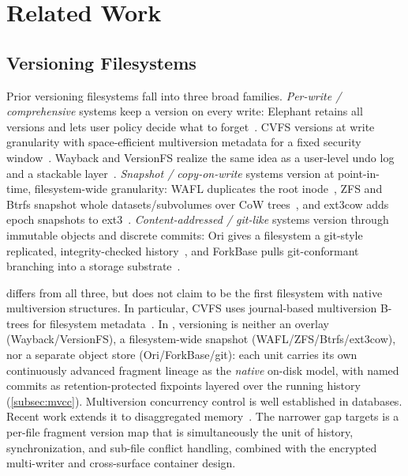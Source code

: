 \section{Related Work}
\label{sec:related}


\subsection{Versioning Filesystems}
\label{subsec:rw-versioning}

Prior versioning filesystems fall into three broad families. \emph{Per-write /
comprehensive} systems
keep a version on every write: Elephant retains all versions and lets
user policy decide what to forget~\citep{Santry1999Elephant}. CVFS versions at
write granularity with space-efficient multiversion metadata for a fixed
security window~\citep{Soules2003CVFS}. Wayback and VersionFS realize the same
idea as a user-level undo log and a stackable
layer~\citep{Cornell2004Wayback, MuniswamyReddy2004VersionFS}. \emph{Snapshot /
copy-on-write} systems version at point-in-time, filesystem-wide granularity:
WAFL duplicates the root inode~\citep{Hitz1994WAFL}, ZFS and Btrfs snapshot
whole datasets/subvolumes over CoW trees~\citep{Rodeh2013Btrfs}, and ext3cow
adds epoch snapshots to ext3~\citep{Peterson2005Ext3cow}. \emph{Content-addressed
/ git-like} systems version through immutable objects and discrete commits: Ori
gives a filesystem a git-style replicated, integrity-checked
history~\citep{Mashtizadeh2013Ori}, and ForkBase pulls git-conformant branching
into a storage substrate~\citep{Lin2020ForkBase}.

\sfs{} differs from all three, but does not claim to be the first filesystem
with native multiversion structures. In particular, CVFS uses journal-based
multiversion B-trees for filesystem metadata~\citep{Soules2003CVFS}. In \sfs{},
versioning is neither an overlay
(Wayback/VersionFS), a filesystem-wide snapshot (WAFL/ZFS/Btrfs/ext3cow), nor a
separate object store (Ori/ForkBase/git): each unit carries its own
continuously advanced fragment lineage as the \emph{native} on-disk model, with
named commits as retention-protected fixpoints layered over the running history
(\cref{subsec:mvcc}). Multiversion concurrency control is well established in
databases. Recent work extends it to disaggregated
memory~\citep{Zhang2024Motor}. The narrower gap \sfs{} targets is a per-file
fragment version map that is simultaneously the unit of history,
synchronization, and sub-file conflict handling, combined with the encrypted
multi-writer and cross-surface container design.

